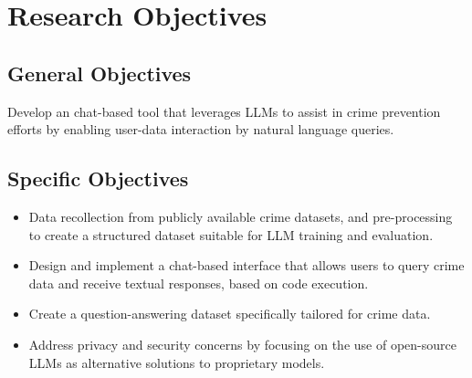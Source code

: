 \section{Research Objectives} %

\subsection{General Objectives}
Develop an chat-based tool that leverages LLMs to assist in crime prevention efforts by enabling user-data interaction by natural language queries.

\subsection{Specific Objectives}
\begin{itemize}
    \item Data recollection from publicly available crime datasets, and pre-processing to create a structured dataset suitable for LLM training and evaluation.

    \item Design and implement a chat-based interface that allows users to query crime data and receive textual responses, based on code execution.
    \item Create a question-answering dataset specifically tailored for crime data.
    \item Address privacy and security concerns by focusing on the use of open-source LLMs as alternative solutions to proprietary models.
\end{itemize}


